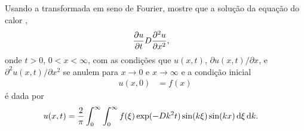 \documentclass[a4paper,12pt, leqno, answers]{exam}
\begin{document}
\begin{questions}
    \question Usando a transformada em seno de Fourier, mostre que a
    solução da equação do calor ,
    \begin{align*}
        \frac{\partial u}{\partial t} & D \frac{\partial ^2 u}{\partial x^2},
    \end{align*}
    onde $t > 0$, $0 < x < \infty$, com as condições que $u(x, t)$,
    $\partial u(x, t) / \partial x$, e $\partial^2 u(x, t) / \partial x^2$ se
    anulem para $x \to 0$ e $x \to \infty$ e a condição inicial
    \begin{align*}
        u(x, 0) &= f(x)
    \end{align*}
    é dada por
    \begin{align*}
        u(x,t) &= \frac{2}{\pi} \int_0^\infty \int_0^\infty f(\xi) \exp(-D
        k^2 t) \sin(k \xi) \sin(k x) \, \mathrm{d}\xi \, \mathrm{d}k.
    \end{align*}
    \begin{solution}
    \end{solution}
\end{questions}
% 
% 
\end{document}
